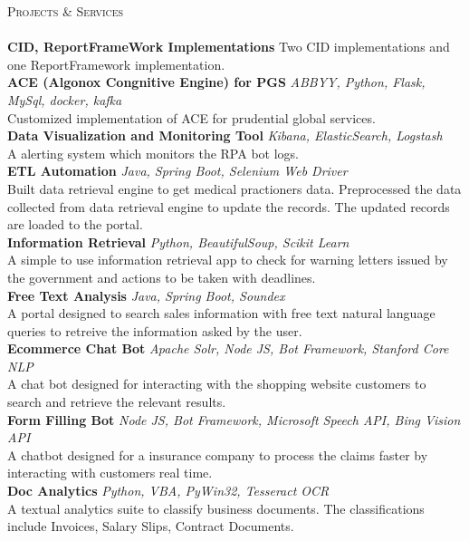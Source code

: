 \documentclass[a4paper]{article}
\newcommand{\lineunder} {
    \vspace*{-8pt} \\
    \hspace*{-18pt} \hrulefill \\
}
\newcommand{\header} [1] {
    {\hspace*{-18pt}\vspace*{6pt} \textsc{#1}}
    \vspace*{-6pt} \lineunder
}
\begin{document}
\vspace*{2mm}
\header{Projects \& Services}
{\textbf{CID, ReportFrameWork Implementations}}
Two CID implementations and one ReportFramework implementation. \\
{\textbf{ACE (Algonox Congnitive Engine) for PGS}} {\sl ABBYY, Python, Flask, MySql, docker, kafka} \\
Customized implementation of ACE for prudential global services.\\
\vspace*{2mm}
{\textbf{Data Visualization and Monitoring Tool}} {\sl Kibana, ElasticSearch, Logstash} \\
A alerting system which monitors the RPA bot logs.\\
\vspace*{2mm}
{\textbf{ETL Automation}} {\sl Java, Spring Boot, Selenium Web Driver} \\
Built data retrieval engine to get medical practioners data. Preprocessed the data collected from data
retrieval engine to update the records. The updated records are loaded to the portal.\\
\vspace*{2mm}
{\textbf{Information Retrieval }} {\sl Python, BeautifulSoup, Scikit Learn} \\
A simple to use information retrieval app to check for warning letters issued by the government and
actions to be taken with deadlines.\\
\vspace*{2mm}
{\textbf{Free Text Analysis}} {\sl Java, Spring Boot, Soundex} \\
A portal designed to search sales information with free text natural language queries to retreive the
information asked by the user. \\
{\textbf{Ecommerce Chat Bot}} {\sl Apache Solr, Node JS, Bot Framework, Stanford Core NLP} \\
A chat bot designed for interacting with the shopping website customers to search and retrieve the
relevant results.\\
\vspace*{2mm}
{\textbf{Form Filling Bot}} {\sl Node JS, Bot Framework, Microsoft Speech API, Bing Vision API} \\
A chatbot designed for a insurance company to process the claims faster by interacting with customers
real time.\\
\vspace*{2mm}
{\textbf{Doc Analytics}} {\sl Python, VBA, PyWin32, Tesseract OCR} \\
A textual analytics suite to classify business documents. The classifications include Invoices, Salary
Slips, Contract Documents.\\
\vspace*{2mm}
\vspace*{2mm}
\end{document}
